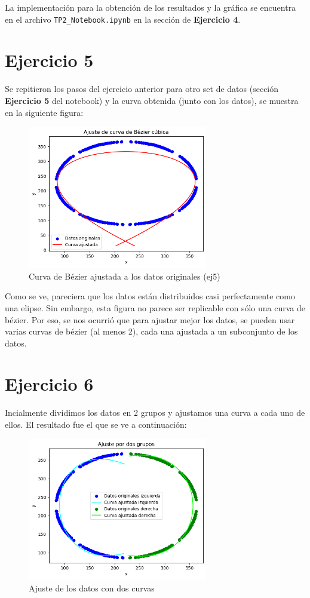 \documentclass{article}
\begin{document}
La implementación para la obtención de los resultados y la gráfica se encuentra en el archivo \texttt{TP2\_Notebook.ipynb} en la sección de \textbf{Ejercicio 4}.

\section{Ejercicio 5}
Se repitieron los pasos del ejercicio anterior para otro set de datos (sección \textbf{Ejercicio 5} del notebook) y la curva obtenida (junto con los datos), se muestra en la siguiente figura:

\begin{figure}[H]
    \centering
    \includegraphics[width=0.7\textwidth]{Imagenes/ej5.png}
    \caption{Curva de Bézier ajustada a los datos originales (ej5)}
\end{figure}

Como se ve, pareciera que los datos están distribuidos casi perfectamente como una elipse. Sin embargo, esta figura no parece ser replicable con sólo una curva de bézier. Por eso, se nos ocurrió que para ajustar mejor los datos, se pueden usar varias curvas de bézier (al menos 2), cada una ajustada a un subconjunto de los datos. 

\section{Ejercicio 6}
Incialmente dividimos los datos en 2 grupos y ajustamos una curva a cada uno de ellos. El resultado fue el que se ve a continuación:

\begin{figure}[H]
    \centering
    \includegraphics[width=0.7\textwidth]{Imagenes/2_curvas_inconexas.png}
    \caption{Ajuste de los datos con dos curvas}
\end{figure}
\end{document}

